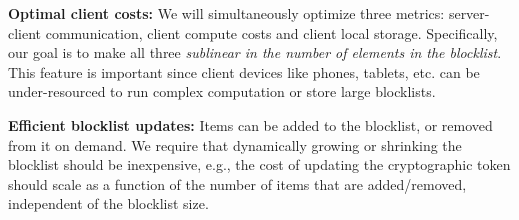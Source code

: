 	
%	
	
	
	\item \textbf{Optimal client costs:} We will simultaneously optimize three 
	metrics: server-client communication, client compute costs and client local storage. Specifically, our 
	goal is to make all three \textit{sublinear in the number of elements in the blocklist}. This feature is important since client devices like 
	phones, tablets, etc. can be under-resourced to run complex computation or 
	store large blocklists.  
		
		
	\item\textbf{Efficient blocklist updates:} Items can be added to the blocklist, or removed from 
	it on demand. We require that dynamically growing or shrinking the blocklist should be 
	inexpensive, e.g., the cost of updating the cryptographic token should scale as a function of 
	the 
	number of items that are added/removed, independent of the blocklist size. 
	
\itemListEnd
\fi
